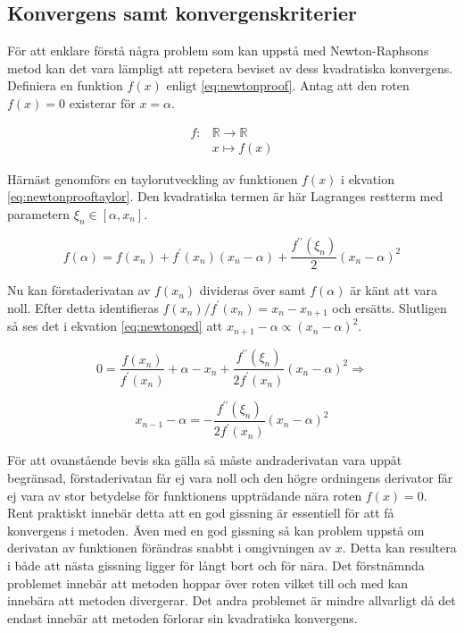 \subsection{Konvergens samt konvergenskriterier}

För att enklare förstå några problem som kan uppstå med Newton-Raphsons metod kan det vara lämpligt
att repetera beviset av dess kvadratiska konvergens. Definiera en funktion $f(x)$ enligt \eqref{eq:newtonproof}.
Antag att den roten $f(x) = 0$ existerar för $x = \alpha$.

\begin{align}
f: & \mathbb{R} \to \mathbb{R} \nonumber \\
   & x \mapsto f(x) \label{eq:newtonproof}
\end{align}

\noindent
Härnäst genomförs en taylorutveckling av funktionen $f(x)$ i ekvation \eqref{eq:newtonprooftaylor}.
Den kvadratiska termen är här Lagranges restterm med parametern $\xi_n \in [\alpha, x_n]$.

\begin{equation}
\label{eq:newtonprooftaylor}
f(\alpha) = f(x_n) + f^\prime(x_n)(x_n-\alpha) + \frac{f^{\prime\prime}(\xi_n)}{2}(x_n-\alpha)^2
\end{equation}

\noindent
Nu kan förstaderivatan av $f(x_n)$ divideras över samt $f(\alpha)$ är känt att vara noll.
Efter detta identifieras $f(x_n)/f^\prime(x_n) = x_n-x_{n+1}$ och ersätts. Slutligen så ses
det i ekvation \eqref{eq:newtonqed} att $x_{n+1}-\alpha \propto (x_{n}-\alpha)^2$.

\begin{equation}
0 = \frac{f(x_n)}{f^\prime(x_n)} + \alpha - x_n + \frac{f^{\prime\prime}(\xi_n)}{2f^\prime(x_n)}(x_n-\alpha)^2
\Rightarrow
\end{equation}

\begin{equation}
\label{eq:newtonqed}
x_{n-1} - \alpha = - \frac{f^{\prime\prime}(\xi_n)}{2f^\prime(x_n)}(x_n-\alpha)^2 
\end{equation}

\noindent
För att ovanstående bevis ska gälla så måste andraderivatan vara uppåt begränsad, förstaderivatan får ej
vara noll och den högre ordningens derivator får ej vara av stor betydelse för funktionens uppträdande
nära roten $f(x) = 0$. Rent praktiskt innebär detta att en god gissning är essentiell för att få
konvergens i metoden. Även med en god gissning så kan problem uppstå om derivatan av funktionen
förändras snabbt i omgivningen av $x$. Detta kan resultera i både att nästa gissning ligger för långt
bort och för nära. Det förstnämnda problemet innebär att metoden hoppar över roten vilket till och med
kan innebära att metoden divergerar. Det andra problemet är mindre allvarligt då det endast innebär 
att metoden förlorar sin kvadratiska konvergens.

